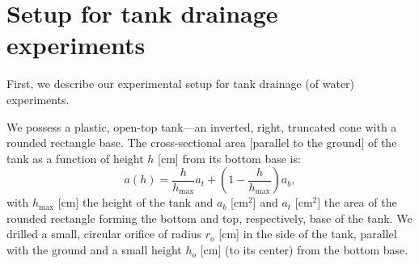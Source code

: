 \documentclass[openacc]{rsproca_new}%
\begin{document}



\section{Setup for tank drainage experiments} \label{sec:expt}
First, we describe our experimental setup for tank drainage (of water) experiments.

We possess a plastic, open-top tank---an inverted, right, truncated cone with a rounded rectangle base. 
The cross-sectional area [parallel to the ground] of the tank as a function of height $h$ [cm] from its bottom base is:
\begin{equation}
	a(h) = \frac{h}{h_{\text{max}}}a_t + \left(1-\frac{h}{h_{\text{max}}}\right) a_b, \label{eq:a_of_h}
\end{equation}
with $h_{\text{max}}$ [cm] the height of the tank and $a_b$ [cm$^2$] and $a_t$ [cm$^2$] the area of the rounded rectangle forming the bottom and top, respectively, base of the tank.
We drilled a small, circular orifice of radius $r_o$ [cm] in the side of the tank, parallel with the ground and a small height $h_o$ [cm] (to its center) from the bottom base.
\end{document}
